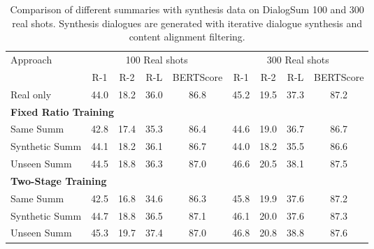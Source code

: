 \begin{table*}[ht]
\centering
\caption{Comparison of different summaries with synthesis data on DialogSum 100 and 300 real shots. Synthesis dialogues are generated with iterative dialogue synthesis and content alignment filtering.}
\label{tab:summaries}
\begin{tabular}{lcccc|cccc}
\toprule
\multirow{2}{*}{Approach} & \multicolumn{4}{c}{100 Real shots} & \multicolumn{4}{c}{300 Real shots} \\
\cmidrule(lr){2-5} \cmidrule(lr){6-9}
& R-1 & R-2 & R-L & BERTScore & R-1 & R-2 & R-L & BERTScore \\
\midrule
Real only & 44.0 & 18.2 & 36.0 & 86.8 & 45.2 & 19.5 & 37.3 & 87.2 \\
\midrule
\multicolumn{5}{l}{\textbf{Fixed Ratio Training}} \\
\midrule
Same Summ & 42.8 & 17.4 & 35.3 & 86.4 & 44.6 & 19.0 & 36.7 & 86.7 \\
Synthetic Summ & 44.1 & 18.2 & 36.1 & 86.7 & 44.0 & 18.2 & 35.5 &  86.6 \\
Unseen Summ & 44.5 & 18.8 & 36.3 & 87.0 & 46.6 & {20.5} & 38.1 & {87.5} \\
\midrule
\multicolumn{5}{l}{\textbf{Two-Stage Training}} \\
\midrule
Same Summ & 42.5 & 16.8 & 34.6 & 86.3 & 45.8 & 19.9 & 37.6 & 87.2 \\
Synthetic Summ & 44.7 & 18.8 & 36.5 & 87.1 & {46.1} & {20.0} & {37.6} & {87.3}   \\
Unseen Summ &  45.3 & 19.7 & 37.4 & 87.0 &  {46.8} & {20.8} & {38.8}  & {87.6}  \\
\bottomrule
\end{tabular}
\end{table*}


